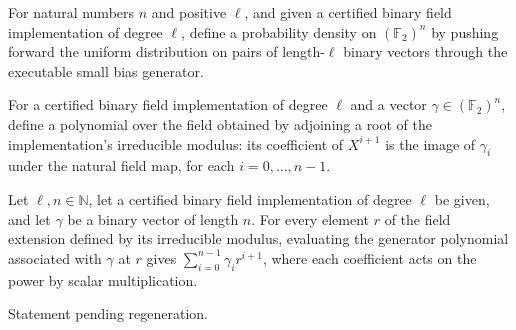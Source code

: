 \begin{definition}
\label{FABL.executableSmallBiasGeneratorDensity}
\leanok
{}
For natural numbers $n$ and positive $\ell$, and given a certified binary field
implementation of degree $\ell$, define a probability density on $(\mathbb{F}_2)^n$ by
pushing forward the uniform distribution on pairs of length-$\ell$ binary vectors
through the executable small bias generator.
\end{definition}

\begin{definition}
\label{FABL.executableSmallBiasPolynomial}
\leanok
{}
For a certified binary field implementation of degree $\ell$ and a vector
$\gamma\in(\mathbb{F}_2)^n$, define a polynomial over the field obtained by adjoining a
root of the implementation's irreducible modulus: its coefficient of $X^{i+1}$ is the
image of $\gamma_i$ under the natural field map, for each $i=0,\ldots,n-1$.
\end{definition}

\begin{theorem}
\label{FABL.executableSmallBiasPolynomial_eval}
\leanok
{}
Let $\ell,n\in\mathbb N$, let a certified binary field implementation of degree $\ell$
be given, and let $\gamma$ be a binary vector of length $n$. For every element $r$ of
the field extension defined by its irreducible modulus, evaluating the generator
polynomial associated with $\gamma$ at $r$ gives $\sum_{i=0}^{n-1}\gamma_i r^{i+1}$,
where each coefficient acts on the power by scalar multiplication.
\end{theorem}

\begin{theorem}
\label{FABL.executableSmallBiasPolynomial_ne_zero}
\leanok
{}
Statement pending regeneration.
\end{theorem}


